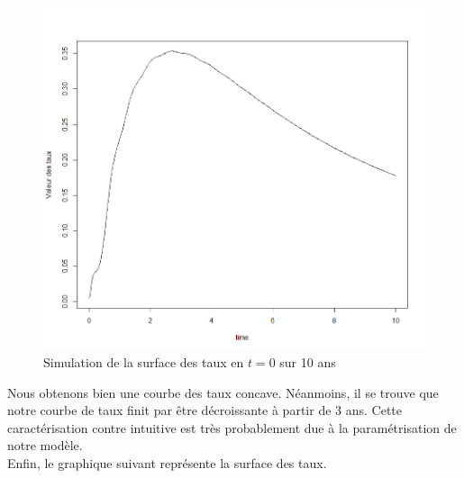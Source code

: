 \documentclass[11pt]{article}
\begin{document}
\begin{figure}[H]
         \centering \includegraphics[scale=0.55]{courbe_des_taux_en_0}
        \caption{Simulation de la surface des taux en $t=0$ sur 10 ans}
\end{figure}

\noindent Nous obtenons bien une courbe des taux concave. Néanmoins, il se trouve que notre courbe de taux finit par être décroissante à partir de $3$ ans. Cette caractérisation contre intuitive est très probablement due à la paramétrisation de notre modèle.\\
\noindent Enfin, le graphique suivant représente la surface des taux.
\end{document}
